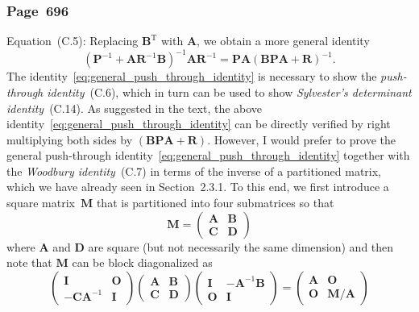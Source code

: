 \documentclass[12pt,a4paper]{article}
\newcommand{\erratum}[1]{%
\subsubsection*{#1}
\addcontentsline{toc}{subsection}{#1}}
\begin{document}
\erratum{Page~696}
Equation~(C.5):
Replacing $\mathbf{B}^{\operatorname{T}}$ with $\mathbf{A}$, we obtain a more general identity
\begin{equation}
\left( \mathbf{P}^{-1} + \mathbf{A}\mathbf{R}^{-1}\mathbf{B} \right)^{-1}
\mathbf{A}\mathbf{R}^{-1}
=
\mathbf{P}\mathbf{A}
\left( \mathbf{B}\mathbf{P}\mathbf{A} + \mathbf{R} \right)^{-1} .
\label{eq:general_push_through_identity}
\end{equation}
The identity~\eqref{eq:general_push_through_identity} is necessary to show
the \emph{push-through identity}~(C.6),
which in turn can be used to show
\emph{Sylvester's determinant identity}~(C.14).
As suggested in the text,
the above identity~\eqref{eq:general_push_through_identity} can be
directly verified by right multiplying both sides by
$\left( \mathbf{B}\mathbf{P}\mathbf{A} + \mathbf{R} \right)$.
However, I would prefer to prove
the general push-through identity~\eqref{eq:general_push_through_identity}
together with the \emph{Woodbury identity}~(C.7) in terms of the inverse of a partitioned matrix,
which we have already seen in Section~2.3.1.
To this end, we first introduce a square matrix~$\mathbf{M}$ that is partitioned into
four submatrices so that
\begin{equation}
\mathbf{M} =
\begin{pmatrix}
\mathbf{A} & \mathbf{B} \\
\mathbf{C} & \mathbf{D}
\end{pmatrix}
\end{equation}
where $\mathbf{A}$ and $\mathbf{D}$ are square (but not necessarily the same dimension)
and then note that $\mathbf{M}$ can be block diagonalized as
\begin{equation}
\begin{pmatrix}
\mathbf{I} & \mathbf{O} \\
-\mathbf{C}\mathbf{A}^{-1} & \mathbf{I}
\end{pmatrix}
\begin{pmatrix}
\mathbf{A} & \mathbf{B} \\
\mathbf{C} & \mathbf{D}
\end{pmatrix}
\begin{pmatrix}
\mathbf{I} & -\mathbf{A}^{-1}\mathbf{B} \\
\mathbf{O} & \mathbf{I}
\end{pmatrix}
=
\begin{pmatrix}
\mathbf{A} & \mathbf{O} \\
\mathbf{O} & \mathbf{M}/\mathbf{A}
\end{pmatrix}
\label{eq:block_diagonalization_of_partitioned_matrix_with_Schur_complement_wrt_A}
\end{equation}
\end{document}
